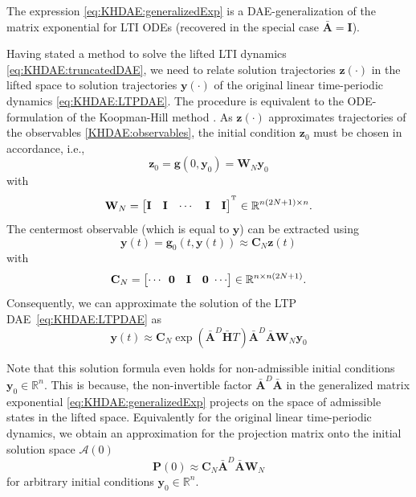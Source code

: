 \documentclass[a4paper, nonatbib, 3p, twocolumn]{elsarticle}
\theoremstyle{plain}
\theoremstyle{definition}
\theoremstyle{remark}
\newcommand{\T}{^{\mathop{\mathrm{T}}}}
\newcommand{\Rspace}{\mathbb{R}}
\newcommand{\vg}{\mathbf g}
\newcommand{\vy}{\mathbf y}
\newcommand{\vz}{\mathbf z}
\newcommand{\vA}{\mathbf A}
\newcommand{\vC}{\mathbf C}
\newcommand{\vH}{\mathbf H}
\newcommand{\vI}{\mathbf I}
\newcommand{\vP}{\mathbf P}
\newcommand{\vW}{\mathbf W}
\newcommand{\cA}{\mathcal{A}}
\begin{document}
The expression \eqref{eq:KHDAE:generalizedExp} is a DAE-generalization of the matrix exponential for LTI ODEs (recovered in the special case $\bar{\vA}=\vI$).

Having stated a method to solve the lifted LTI dynamics \eqref{eq:KHDAE:truncatedDAE}, we need to relate solution trajectories $\vz(\cdot)$ in the lifted space to solution trajectories $\vy(\cdot)$ of the original linear time-periodic dynamics \eqref{eq:KHDAE:LTPDAE}. The procedure is equivalent to the ODE-formulation of the Koopman-Hill method \cite{Bayer2024}. As $\vz(\cdot)$ approximates trajectories of the observables \eqref{KHDAE:observables}, the initial condition $\vz_0$ must be chosen in accordance, i.e.,
\begin{equation}
    \vz_0 = \vg(0,\vy_0) = \vW_N \vy_0
\end{equation}
with
\begin{equation}
	\vW_N=\begin{bmatrix}
		\vI&\vI&\cdots&\vI&\vI
	\end{bmatrix}^{\T} \in \mathbb{R}^{n(2N+1)\times n} \textnormal{.}
\end{equation}
The centermost observable (which is equal to $\vy$) can be extracted using
\begin{equation}
    \vy(t) = \vg_0(t,\vy(t)) \approx \vC_N \vz(t)
\end{equation}
with
\begin{equation}
	\vC_N=\begin{bmatrix}
		\cdots&\!\!\!\mathbf{0}&\vI&\mathbf{0}\!\!\!&\cdots
	\end{bmatrix} \in \mathbb{R}^{n\times n(2N+1)}\textnormal{.}
\end{equation}
Consequently, we can approximate the solution of the LTP DAE~\eqref{eq:KHDAE:LTPDAE} as
\begin{equation}\label{eq:KHDAE:KHmethod}
		\vy(t)\approx \vC_N \exp\left( \bar{\vA}^D \bar{\vH} T \right) \bar{\vA} ^D \bar{\vA}\vW_N\vy_0
\end{equation}

Note that this solution formula even holds for non-admissible initial conditions $\vy_0\in\Rspace^n$. This is because, the non-invertible factor $\bar{\vA}^D\bar{\vA}$ in the generalized matrix exponential \eqref{eq:KHDAE:generalizedExp} projects on the space of admissible states in the lifted space. Equivalently for the original linear time-periodic dynamics, we obtain an approximation for the projection matrix onto the initial solution space $\cA(0)$
\begin{equation}
    \vP(0) \approx \vC_N \bar{\vA}^D\bar{\vA} \vW_N
\end{equation}
for arbitrary initial conditions $\vy_0\in\Rspace^n$.
\end{document}

